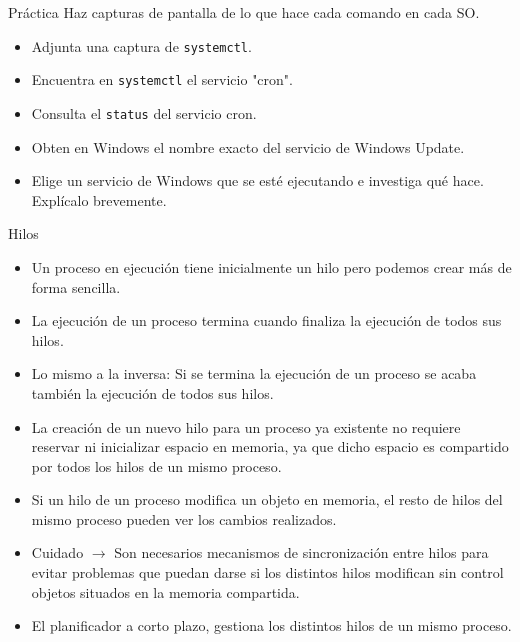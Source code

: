 \documentclass{beamer}
\begin{document}
\begin{frame}{Práctica}
\centering Haz capturas de pantalla de lo que hace cada comando en cada SO.
    \begin{itemize}
        \item Adjunta una captura de \texttt{systemctl}.
        \item Encuentra en \texttt{systemctl} el servicio "cron".
        \item Consulta el \texttt{status} del servicio cron.
        \item Obten en Windows el nombre exacto del servicio de Windows Update.
        \item Elige un servicio de Windows que se esté ejecutando e investiga qué hace. Explícalo brevemente.
    \end{itemize}

\end{frame}


\begin{frame}{Hilos}
    \begin{itemize}
        \item Un proceso en ejecución tiene inicialmente un hilo pero podemos crear más de
        forma sencilla.
        \item La ejecución de un proceso termina cuando finaliza la ejecución de todos sus hilos.
        \item Lo mismo a la inversa: Si se termina la ejecución de un proceso se acaba también la
        ejecución de todos sus hilos.
        \item La creación de un nuevo hilo para un proceso ya existente no requiere reservar ni
        inicializar espacio en memoria, ya que dicho espacio es compartido por todos los
        hilos de un mismo proceso.
        \item Si un hilo de un proceso modifica un objeto en memoria, el resto de hilos del mismo
        proceso pueden ver los cambios realizados.
    \end{itemize}
\end{frame}

\begin{frame}
    \begin{itemize}
    \item Cuidado $\to$ Son necesarios mecanismos de sincronización entre hilos para evitar
    problemas que puedan darse si los distintos hilos modifican sin control objetos
    situados en la memoria compartida.
    \item El planificador a corto plazo, gestiona los distintos hilos de un mismo proceso.
    \end{itemize}
\end{frame}
\end{document}
